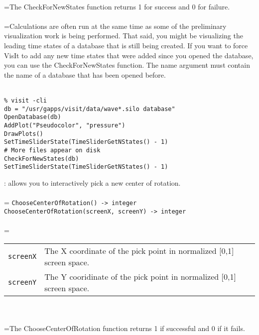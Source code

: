 \documentclass[10pt,a4paper]{report}
\begin{document}
 \\ 
\hangindent=\parindent The CheckForNewStates function returns 1 for success and 0 for failure. \\[-3mm] 

 \\ 
\hangindent=\parindent Calculations are often run at the same time as some of the preliminary visualization work is being performed. That said, you might be visualizing the leading time states of a database that is still being created. If you want to force VisIt to add any new time states that were added since you opened the database, you can use the CheckForNewStates function. The name argument must contain the name of a database that has been opened before. \\[-3mm] 

\\[-6mm]
\begin{verbatim}% visit -cli
db = "/usr/gapps/visit/data/wave*.silo database"
OpenDatabase(db)
AddPlot("Pseudocolor", "pressure")
DrawPlots()
SetTimeSliderState(TimeSliderGetNStates() - 1)
# More files appear on disk
CheckForNewStates(db)
SetTimeSliderState(TimeSliderGetNStates() - 1)
\end{verbatim}
\newpage


{}
: allows you to interactively pick a new center of rotation.\\[-3mm]

 \\ 
\hangindent=\parindent 
\verb!ChooseCenterOfRotation() -> integer!\\ 
\verb!ChooseCenterOfRotation(screenX, screenY) -> integer!\\ [-3mm]

 \\ 
\hangindent=\parindent 
\begin{tabular}{lp{9cm}}
\verb!screenX! & The X coordinate of the pick point in normalized [0,1] screen space. \\
\verb!screenY! & The Y cooridinate of the pick point in normalized [0,1] screen space. \\
\end{tabular} \\[-2mm]


 \\ 
\hangindent=\parindent The ChooseCenterOfRotation function returns 1 if successful and 0 if it fails. \\[-3mm] 
\end{document}
